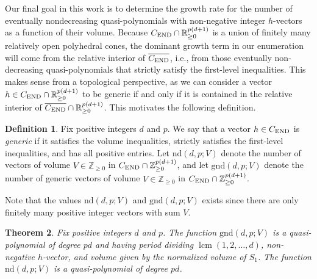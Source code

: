 \documentclass[12pt]{amsart}
\newtheorem{thm}{Theorem}[section]
\theoremstyle{definition}
\newtheorem{defn}[thm]{Definition}
\numberwithin{equation}{section}
\renewcommand\>{\rangle}
\newcommand\<{\langle}
\newcommand\0{\mathbf{0}}
\newcommand\RR{\mathbb{R}}
\newcommand\ZZ{\mathbb{Z}}
\DeclareMathOperator\lcm{lcm} %
\newcommand{\CEND}{C_\textnormal{END}}
\newcommand\nd{\mathrm{nd}}
\newcommand\gnd{\mathrm{gnd}}
\begin{document}
Our final goal in this work is to determine the growth rate for the number of eventually nondecreasing quasi-polynomials with non-negative integer $h$-vectors as a function of their volume.
Because $C_{\textnormal{END}}\cap \RR_{\geq 0}^{p(d+1)}$ is a union of finitely many relatively open polyhedral cones, the dominant growth term in our enumeration will come from the relative interior of $\overline{\CEND}$, i.e., from those eventually non-decreasing quasi-polynomials that strictly satisfy the first-level inequalities.
This makes sense from a topological perspective, as we can consider a vector $h\in C_{\textnormal{END}}\cap \RR_{\geq 0}^{p(d+1)}$ to be generic if and only if it is contained in the relative interior of $ \overline{\CEND}\cap \RR_{\geq 0}^{p(d+1)}$.
This motivates the following definition.

\begin{defn}\label{d:fixedvolume}
Fix positive integers $d$ and $p$.
We say that a vector $h\in C_{\textnormal{END}}$ is \emph{generic} if it satisfies the volume inequalities, strictly satisfies the first-level inequalities, and has all positive entries.
Let $\nd(d,p;V)$ denote the number of vectors of volume $V\in \ZZ_{\geq 0}$ in $C_{\textnormal{END}}\cap \ZZ_{\geq 0}^{p(d+1)}$, and let $\gnd(d,p;V)$ denote the number of generic vectors of volume $V\in \ZZ_{\geq 0}$ in $C_{\textnormal{END}}\cap \ZZ_{\geq 0}^{p(d+1)}$.
\end{defn}

Note that the values $\nd(d,p;V)$ and $\gnd(d,p;V)$ exists since there are only finitely many positive integer vectors with sum $V$.

\begin{thm}\label{thm:enumeration}
Fix positive integers $d$ and $p$.
The function $\gnd(d,p;V)$ is a quasi-polynomial of degree $pd$ and having period dividing $\lcm(1,2,\ldots,d)$, non-negative $h$-vector, and volume given by the normalized volume of $S_1$.
The function $\nd(d,p;V)$ is a quasi-polynomial of degree $pd$.
\end{thm}
\end{document}
